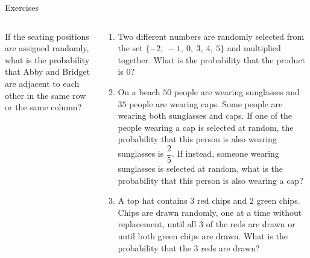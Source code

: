 \documentclass[9pt,aspectratio=169]{beamer}
\begin{document}
\begin{frame}{Exercises}
\begin{columns}[T]
\begin{column}{0.5\textwidth}
\begin{enumerate}
        If the seating positions are assigned randomly, what is the probability that Abby and Bridget are adjacent to each other in the same row or the same column? %
        \seti
      \end{enumerate}
    \end{column}
    \begin{column}{0.5\textwidth}
      \setlength{\leftmargini}{0cm}
      \begin{enumerate}
        \conti
        \item Two different numbers are randomly selected from the set $\{ - 2,\ -1,\ 0,\ 3,\ 4,\ 5\}$ and multiplied together. What is the probability that the product is $0$? %
        \item On a beach $50$ people are wearing sunglasses and $35$ people are wearing caps. Some people are wearing both sunglasses and caps. If one of the people wearing a cap is selected at random, the probability that this person is also wearing sunglasses is $\dfrac{2}{5}$. If instead, someone wearing sunglasses is selected at random, what is the probability that this person is also wearing a cap? %
        \item A top hat contains $3$ red chips and $2$ green chips. Chips are drawn randomly, one at a time without replacement, until all $3$ of the reds are drawn or until both green chips are drawn. What is the probability that the $3$ reds are drawn? %
      \end{enumerate}
    \end{column}
  \end{columns}
\end{frame}
\end{document}
